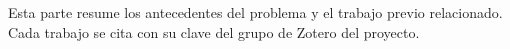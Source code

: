 
Esta parte resume los antecedentes del problema y el trabajo previo relacionado.
Cada trabajo se cita con su clave del grupo de Zotero del proyecto.

